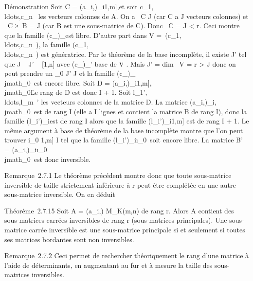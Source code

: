 \documentclass[]{article}
\begin{document}
Démonstration Soit C = (a\_i,\jmath)\_i\in{[}1,m{]},\jmath\inJ et soit
c\_1,\\ldots,c\_n~
les vecteurs colonnes de A. On a
\mathrmrg~C
\leq\textbar{}J\textbar{} (car C a \textbar{}J\textbar{} vecteurs colonnes)
et \mathrmrg~C
≥\mathrmrg~B =
\textbar{}J\textbar{} (car B est une sous-matrice de C). Donc
\mathrmrg~C =
\textbar{}J\textbar{} \textless{} r. Ceci montre que la famille
(c\_\jmath)\_\jmath\inJ est libre. D'autre part dans V
=\
\mathrmVect(c\_1,\\ldots,c\_n~),
la famille
(c\_1,\\ldots,c\_n~)
est génératrice. Par le théorème de la base incomplète, il existe J' tel
que J \subset~ J' \subset~ {[}1,n{]} avec (c\_\jmath)\_\jmath\inJ' base de V .
Mais \textbar{}J'\textbar{} = dim~ V = r
\textgreater{} \textbar{}J\textbar{} donc on peut prendre un
\jmath\_0 ' \diagdown J et la famille
(c\_\jmath)\_\jmath\inJ\cup\\jmath\_0\
est encore libre. Soit D =
(a\_i,\jmath)\_i\in{[}1,m{]},\jmath\inJ\cup\\jmath\_0\.
Le rang de D est donc \textbar{}I\textbar{} + 1. Soit
l\_1',\\ldots,l\_m~'
les vecteurs colonnes de la matrice D. La matrice
(a\_i,\jmath)\_i\inI,\jmath\inJ\cup\\jmath\_0\
est de rang \textbar{}I\textbar{} (elle a \textbar{}I\textbar{} lignes
et contient la matrice B de rang \textbar{}I\textbar{}), donc la famille
(l\_i')\_i\inI est de rang \textbar{}I\textbar{} alors que
la famille (l\_i')\_i\in{[}1,m{]} est de rang
\textbar{}I\textbar{} + 1. Le même argument à base de théorème de la
base incomplète montre que l'on peut trouver i\_0 \in {[}1,m{]} \diagdown
I tel que la famille
(l\_i')\_i\inI\cup\i\_0\
soit encore libre. La matrice B' =
(a\_i,\jmath)\_i\inI\cup\i\_0\,\jmath\inJ\cup\\jmath\_0\
est donc inversible.

Remarque~2.7.1 Le théorème précédent montre donc que toute sous-matrice
inversible de taille strictement inférieure à r peut être complétée en
une autre sous-matrice inversible. On en déduit

Théorème~2.7.15 Soit A = (a\_i,\jmath) \in M\_K(m,n) de rang r.
Alors A contient des sous-matrices carrées inversibles de rang r
(sous-matrices principales). Une sous-matrice carrée inversible est une
sous-matrice principale si et seulement si toutes ses matrices bordantes
sont non inversibles.

Remarque~2.7.2 Ceci permet de rechercher théoriquement le rang d'une
matrice à l'aide de déterminants, en augmentant au fur et à mesure la
taille des sous-matrices inversibles.
\end{document}
